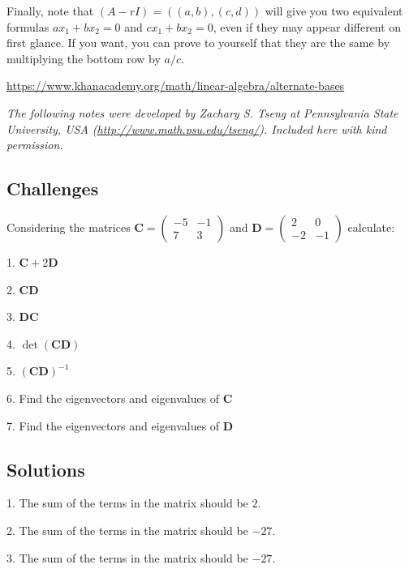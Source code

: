 Finally, note that $(A-rI) = ((a, b), (c, d))$ will give you two equivalent formulas $a x_1 + b x_2 = 0$ and $c x_1 + b x_2 = 0$, even if they may appear different on first glance. If you want, you can prove to yourself that they are the same by multiplying the bottom row by $a/c$.

\vspace{0.2cm}
\noindent [1] \url{https://www.khanacademy.org/math/linear-algebra/alternate-bases}

\emph{The following notes were developed by Zachary S. Tseng at Pennsylvania State University, USA (\url{http://www.math.psu.edu/tseng/}). Included here with kind permission.}



\subsection*{Challenges}
Considering the matrices
$\displaystyle
    \mathbf{C} =
\left(
    \begin{array}{cc}
        -5 & -1 \\
        7 & 3
    \end{array}
\right)
$
and
$\displaystyle
    \mathbf{D} =
\left(
    \begin{array}{cc}
        2 & 0 \\
        -2 & -1
    \end{array}
\right)
$
calculate:

1. $\mathbf{C} + 2 \mathbf{D}$

2. $\mathbf{C} \mathbf{D}$

3. $\mathbf{D} \mathbf{C}$

4. $\det(\mathbf{CD})$

5. $\mathbf{(CD)}^{-1}$

6. Find the eigenvectors and eigenvalues of $\mathbf{C}$

7. Find the eigenvectors and eigenvalues of $\mathbf{D}$

\subsection*{Solutions}
1. The sum of the terms in the matrix should be $2$.

2. The sum of the terms in the matrix should be $-27$.

3. The sum of the terms in the matrix should be $-27$.

